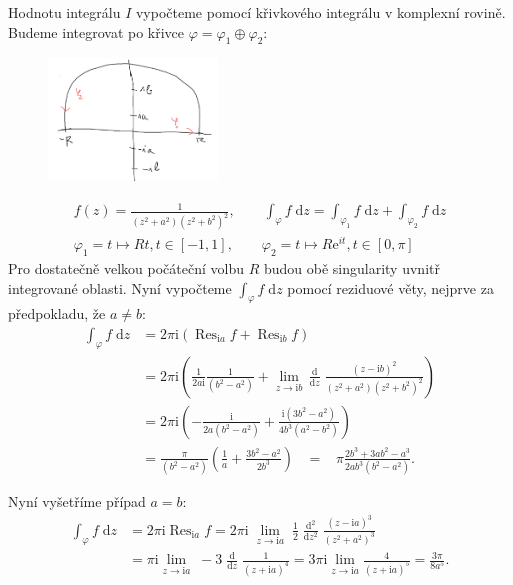 \documentclass[10pt,a4paper]{article}
\newcommand{\const}[1]{\text{#1}}
\newcommand{\Res}{\operatorname{Res}}
\renewcommand{\d}[1]{\;\const{d}#1}
\newcommand{\dd}[2]{\frac{\const{d} #1}{\const{d} #2} \;}
\newcommand{\e}[1]{\const{e}^{#1}}
\renewcommand{\i}{\const{i}}
\begin{document}
Hodnotu integrálu $I$ vypočteme pomocí křivkového integrálu v komplexní rovině. Budeme integrovat po křivce $\varphi = \varphi_1 \oplus \varphi_2$:
\begin{figure}[H]
    \centering
    \includegraphics[width=0.4\textwidth]{du2_1.PNG}
    \label{obr:du2u1param}
\end{figure}
\begin{gather*}
    f(z) = \frac{1}{(z^2+a^2)(z^2+b^2)^2},
    \hspace{2em}
    \int_\varphi f \d{z} = \int_{\varphi_1} f \d{z} + \int_{\varphi_2} f \d{z}
    \\[5pt]
    \varphi_1 = t \mapsto Rt, t \in [-1, 1],
    \hspace{2em}
    \varphi_2 = t \mapsto R\e{it}, t \in [0, \pi]
\end{gather*}
Pro dostatečně velkou počáteční volbu $R$ budou obě singularity uvnitř integrované oblasti. Nyní vypočteme $\int_\varphi f \d{z}$ pomocí reziduové věty, nejprve za předpokladu, že $a\neq b$:
\begin{align*}
    \int_\varphi f \d{z}
    &= 2\pi\i \left( \Res_{\i a} f + \Res_{\i b} f \right) \\
    &= 2\pi\i \left(
        \frac{1}{2a\i} \frac{1}{(b^2 - a^2)} +
        \lim_{z \to \i b} \,\dd{}{z}\! \frac{(z- \i b)^2}{(z^2+a^2)(z^2+b^2)^2}
    \right) \\[5pt]
    &= 2\pi\i \left(
        -\frac{\i}{2a(b^2 - a^2)} +
        \frac{\i (3b^2 - a^2)}{4b^3 (a^2 - b^2)}
    \right)
    \\[5pt]
    &= \frac{\pi}{(b^2 - a^2)} \left( \frac{1}{a} + \frac{3b^2 - a^2}{2b^3} \right)
    \;\;\; = \;\;\; \pi \frac{2b^3 + 3ab^2 - a^3}{2ab^3 (b^2 - a^2)}.
\end{align*}

Nyní vyšetříme případ $a=b$:
\begin{align*}
    \int_\varphi f \d{z}
    &= 2\pi\i \Res_{\i a} f
    = 2\pi\i \; \lim_{z \to \i a} \; \frac{1}{2} \; \dd{^2}{z^2} \frac{(z-\i a)^3}{(z^2 + a^2)^3}
    \\[5pt]
    &= \pi \i \lim_{z \to \i a} \; -3 \; \dd{}{z} \frac{1}{(z + \i a)^4}
    = 3\pi\i \lim_{z \to \i a} \frac{4}{(z+\i a)^5}
    = \frac{3\pi}{8a^5}.
\end{align*}
\end{document}

